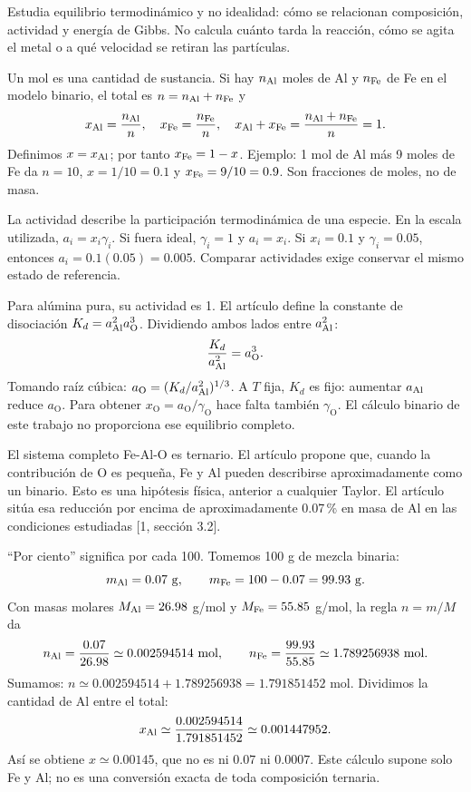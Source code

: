 Estudia equilibrio termodinámico y no idealidad: cómo se relacionan composición, actividad y energía de Gibbs. No calcula cuánto tarda la reacción, cómo se agita el metal o a qué velocidad se retiran las partículas.

Un mol es una cantidad de sustancia. Si hay $n_{\mathrm{Al}}$ moles de Al y $n_{\mathrm{Fe}}$ de Fe en el modelo binario, el total es $n=n_{\mathrm{Al}}+n_{\mathrm{Fe}}$ y
\[
x_{\mathrm{Al}}=\frac{n_{\mathrm{Al}}}{n},\quad x_{\mathrm{Fe}}=\frac{n_{\mathrm{Fe}}}{n},\quad
x_{\mathrm{Al}}+x_{\mathrm{Fe}}=\frac{n_{\mathrm{Al}}+n_{\mathrm{Fe}}}n=1.
\]
Definimos $x=x_{\mathrm{Al}}$; por tanto $x_{\mathrm{Fe}}=1-x$. Ejemplo: 1 mol de Al más 9 moles de Fe da $n=10$, $x=1/10=0.1$ y $x_{\mathrm{Fe}}=9/10=0.9$. Son fracciones de moles, no de masa.

La actividad describe la participación termodinámica de una especie. En la escala utilizada, $a_i=x_i\gamma_i$. Si fuera ideal, $\gamma_i=1$ y $a_i=x_i$. Si $x_i=0.1$ y $\gamma_i=0.05$, entonces $a_i=0.1(0.05)=0.005$. Comparar actividades exige conservar el mismo estado de referencia.

Para alúmina pura, su actividad es 1. El artículo define la constante de disociación $K_d=a_{\mathrm{Al}}^2a_{\mathrm O}^3$. Dividiendo ambos lados entre $a_{\mathrm{Al}}^2$:
\[
\frac{K_d}{a_{\mathrm{Al}}^2}=a_{\mathrm O}^3.
\]
Tomando raíz cúbica: $a_{\mathrm O}=(K_d/a_{\mathrm{Al}}^2)^{1/3}$. A $T$ fija, $K_d$ es fijo: aumentar $a_{\mathrm{Al}}$ reduce $a_{\mathrm O}$. Para obtener $x_{\mathrm O}=a_{\mathrm O}/\gamma_{\mathrm O}$ hace falta también $\gamma_{\mathrm O}$. El cálculo binario de este trabajo no proporciona ese equilibrio completo.

El sistema completo Fe-Al-O es ternario. El artículo propone que, cuando la contribución de O es pequeña, Fe y Al pueden describirse aproximadamente como un binario. Esto es una hipótesis física, anterior a cualquier Taylor. El artículo sitúa esa reducción por encima de aproximadamente 0.07\,\% en masa de Al en las condiciones estudiadas [1, sección 3.2].

``Por ciento'' significa por cada 100. Tomemos 100 g de mezcla binaria:
\[
m_{\mathrm{Al}}=0.07\ \mathrm g,\qquad m_{\mathrm{Fe}}=100-0.07=99.93\ \mathrm g.
\]
Con masas molares $M_{\mathrm{Al}}=26.98$ g/mol y $M_{\mathrm{Fe}}=55.85$ g/mol, la regla $n=m/M$ da
\[
n_{\Al}=\frac{0.07}{26.98}\simeq0.002594514\ \mathrm{mol},\qquad
n_{\Fe}=\frac{99.93}{55.85}\simeq1.789256938\ \mathrm{mol}.
\]
Sumamos: $n\simeq0.002594514+1.789256938=1.791851452$ mol. Dividimos la cantidad de Al entre el total:
\[
x_{\mathrm{Al}}\simeq\frac{0.002594514}{1.791851452}\simeq0.001447952.
\]
Así se obtiene $x\simeq0.00145$, que no es ni $0.07$ ni $0.0007$. Este cálculo supone solo Fe y Al; no es una conversión exacta de toda composición ternaria.

